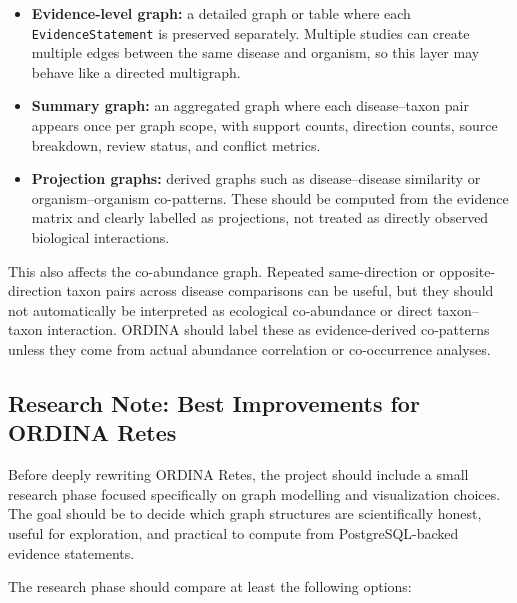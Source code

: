 \documentclass[11pt,a4paper]{article}
\begin{document}
\begin{itemize}[noitemsep]
    \item \textbf{Evidence-level graph:} a detailed graph or table where each \texttt{EvidenceStatement} is preserved separately. Multiple studies can create multiple edges between the same disease and organism, so this layer may behave like a directed multigraph.
    \item \textbf{Summary graph:} an aggregated graph where each disease--taxon pair appears once per graph scope, with support counts, direction counts, source breakdown, review status, and conflict metrics.
    \item \textbf{Projection graphs:} derived graphs such as disease--disease similarity or organism--organism co-patterns. These should be computed from the evidence matrix and clearly labelled as projections, not treated as directly observed biological interactions.
\end{itemize}

This also affects the co-abundance graph. Repeated same-direction or opposite-direction taxon pairs across disease comparisons can be useful, but they should not automatically be interpreted as ecological co-abundance or direct taxon--taxon interaction. ORDINA should label these as evidence-derived co-patterns unless they come from actual abundance correlation or co-occurrence analyses.

\subsection{Research Note: Best Improvements for ORDINA Retes}

Before deeply rewriting ORDINA Retes, the project should include a small research phase focused specifically on graph modelling and visualization choices. The goal should be to decide which graph structures are scientifically honest, useful for exploration, and practical to compute from PostgreSQL-backed evidence statements.

The research phase should compare at least the following options:
\end{document}
